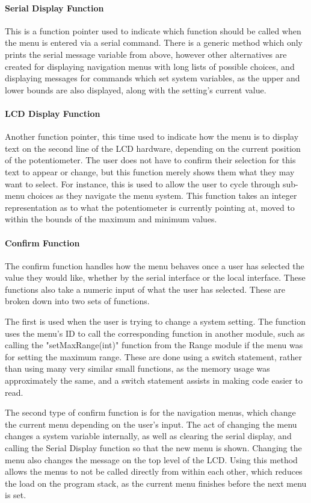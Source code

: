 \documentclass[]{report}
\begin{document}
\paragraph{Serial Display Function}
This is a function pointer used to indicate which function should be called when the menu is entered via a serial command. There is a generic method which only prints the serial message variable from above, however other alternatives are created for displaying navigation menus with long lists of possible choices, and displaying messages for commands which set system variables, as the upper and lower bounds are also displayed, along with the setting's current value.

\paragraph{LCD Display Function}
Another function pointer, this time used to indicate how the menu is to display text on the second line of the LCD hardware, depending on the current position of the potentiometer. The user does not have to confirm their selection for this text to appear or change, but this function merely shows them what they may want to select. For instance, this is used to allow the user to cycle through sub-menu choices as they navigate the menu system. This function takes an integer representation as to what the potentiometer is currently pointing at, moved to within the bounds of the maximum and minimum values. 

\paragraph{Confirm Function}
The confirm function handles how the menu behaves once a user has selected the value they would like, whether by the serial interface or the local interface. These functions also take a numeric input of what the user has selected. These are broken down into two sets of functions. 

The first is used when the user is trying to change a system setting. The function uses the menu's ID to call the corresponding function in another module, such as calling the "setMaxRange(int)" function from the Range module if the menu was for setting the maximum range. These are done using a switch statement, rather than using many very similar small functions, as the memory usage was approximately the same, and a switch statement assists in making code easier to read.   

The second type of confirm function is for the navigation menus, which change the current menu depending on the user's input. The act of changing the menu changes a system variable internally, as well as clearing the serial display, and calling the Serial Display function so that the new menu is shown. Changing the menu also changes the message on the top level of the LCD. Using this method allows the menus to not be called directly from within each other, which reduces the load on the program stack, as the current menu finishes before the next menu is set.
\end{document}
